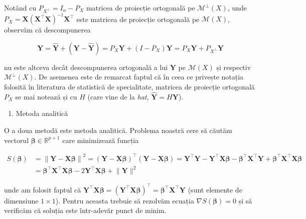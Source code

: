 \documentclass[]{article}
\providecommand{\tightlist}{%
  \setlength{\itemsep}{0pt}\setlength{\parskip}{0pt}}
\begin{document}
Notând cu \(P_{X^\perp} = I_n - P_X\) matricea de proiecție ortogonală
pe \(\mathcal{M}^\perp(X)\), unde
\(P_X = \boldsymbol X(\boldsymbol X^\intercal \boldsymbol X)^{-1} \boldsymbol X^\intercal\)
este matricea de proiecție ortogonală pe \(\mathcal{M}(X)\), observăm că
descompunerea

\[
  \boldsymbol Y = \hat{\boldsymbol Y} + \left(\boldsymbol Y - \hat{\boldsymbol Y}\right) = P_X\boldsymbol Y + (I - P_X)\boldsymbol Y = P_X\boldsymbol Y + P_{X^\perp}\boldsymbol Y
\]

nu este altceva decât descompunerea ortogonală a lui \(\boldsymbol Y\)
pe \(\mathcal{M}(X)\) și respectiv \(\mathcal{M}^\perp(X)\). De asemenea
este de remarcat faptul că în ceea ce privește notația folosită în
literatura de statistică de specialitate, matricea de proiecție
ortogonală \(P_X\) se mai notează și cu \(H\) (care vine de la
\emph{hat}, \(\hat{\boldsymbol Y} = H\boldsymbol Y\)).

\begin{enumerate}
\def\labelenumi{\alph{enumi})}
\setcounter{enumi}{1}
\tightlist
\item
  Metoda analitică
\end{enumerate}

O a doua metodă este metoda analitică. Problema noastră cere să căutăm
vectorul \(\boldsymbol \beta\in\mathbb{R}^{p+1}\) care minimizează
funcția

\begin{align*}
S(\boldsymbol \beta) &= \left\lVert \boldsymbol Y - \boldsymbol X \boldsymbol\beta\right\rVert^2 = \left(\boldsymbol Y - \boldsymbol X \boldsymbol\beta\right)^\intercal\left(\boldsymbol Y - \boldsymbol X \boldsymbol\beta\right) = \boldsymbol Y^\intercal \boldsymbol Y - \boldsymbol Y^\intercal \boldsymbol X \boldsymbol\beta - \boldsymbol \beta^\intercal \boldsymbol X^\intercal \boldsymbol Y + \boldsymbol \beta^\intercal \boldsymbol X^\intercal \boldsymbol X \boldsymbol\beta \\
  & = \boldsymbol \beta^\intercal \boldsymbol X^\intercal \boldsymbol X \boldsymbol\beta - 2 \boldsymbol Y^\intercal \boldsymbol X \boldsymbol\beta + \lVert  \boldsymbol Y \rVert^2
\end{align*}

unde am folosit faptul că
\(\boldsymbol Y^\intercal \boldsymbol X \boldsymbol\beta = \left(\boldsymbol Y^\intercal \boldsymbol X \boldsymbol\beta\right)^\intercal = \boldsymbol \beta^\intercal \boldsymbol X^\intercal \boldsymbol Y\)
(sunt elemente de dimensiune \(1\times 1\)). Pentru aceasta trebuie să
rezolvăm ecuația \(\nabla S(\boldsymbol \beta) = 0\) și să verificăm că
soluția este într-adevăr punct de minim.
\end{document}

